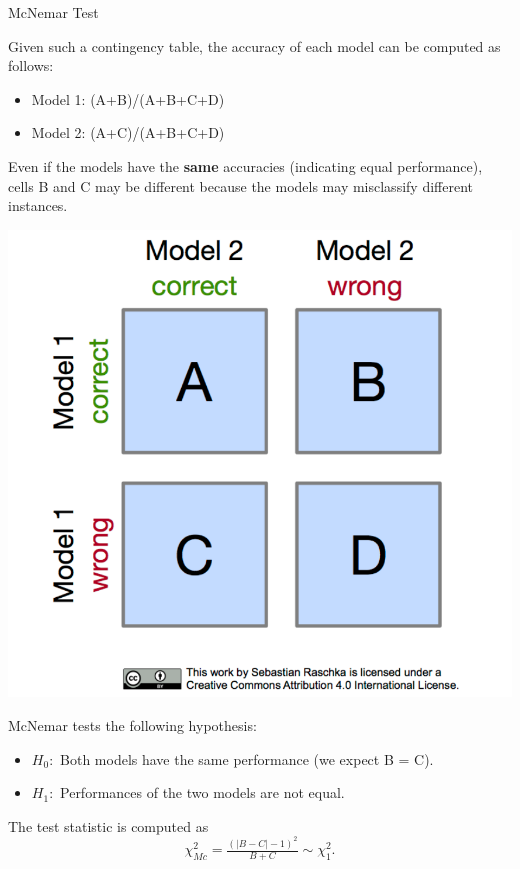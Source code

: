 \begin{frame}[c,allowframebreaks]{McNemar Test}
    \framebreak

    \begin{minipage}[c]{0.625\linewidth}
    Given such a contingency table, the accuracy of each model can be computed as follows:
    \begin{itemize}
      \item Model 1: (A+B)/(A+B+C+D)
      \item Model 2: (A+C)/(A+B+C+D)
    \end{itemize}

    Even if the models have the \textbf{same} accuracies (indicating equal performance), cells B and C may be different because the models may misclassify different instances.
    \end{minipage}
    \begin{minipage}[c]{0.2\linewidth}
        \includegraphics[width=\textwidth]{mcnemar_1.png}
    \end{minipage}

    McNemar tests the following hypothesis:
    \begin{itemize}
    \item $H_0:$ Both models have the same performance (we expect B = C).
    \item $H_1:$ Performances of the two models are not equal.
    \end{itemize}

    The test statistic is computed as
    $$\chi^2_{Mc} =  \tfrac{(|B-C| - 1)^2}{B + C} \sim \chi^2_{1}.$$


\end{frame}
